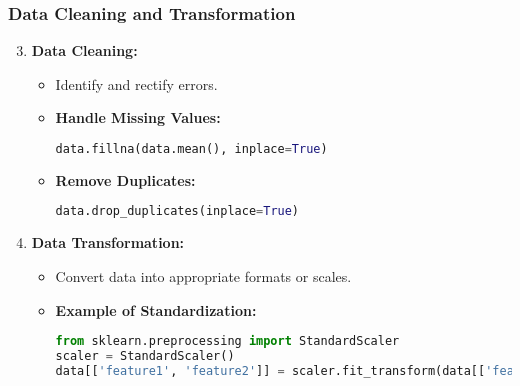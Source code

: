 \documentclass[aspectratio=169]{beamer}
\begin{document}
\begin{frame}[fragile]
    \frametitle{Data Cleaning and Transformation}
    \begin{enumerate}
        \setcounter{enumi}{2}
        \item \textbf{Data Cleaning:}
        \begin{itemize}
            \item Identify and rectify errors.
            \item \textbf{Handle Missing Values:}
            \begin{lstlisting}[language=Python]
data.fillna(data.mean(), inplace=True)
            \end{lstlisting}
            \item \textbf{Remove Duplicates:}
            \begin{lstlisting}[language=Python]
data.drop_duplicates(inplace=True)
            \end{lstlisting}
        \end{itemize}
        
        \item \textbf{Data Transformation:}
        \begin{itemize}
            \item Convert data into appropriate formats or scales.
            \item \textbf{Example of Standardization:}
            \begin{lstlisting}[language=Python]
from sklearn.preprocessing import StandardScaler
scaler = StandardScaler()
data[['feature1', 'feature2']] = scaler.fit_transform(data[['feature1', 'feature2']])
            \end{lstlisting}
        \end{itemize}
    \end{enumerate}
\end{frame}
\end{document}
